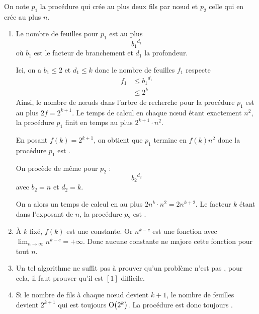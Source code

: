 \begin{td-sol}
    On note \(p_1\) la procédure qui crée au plus deux fils par nœud et \(p_2\) celle qui en crée au plus \(n\).

    \begin{enumerate}
        \item Le nombre de feuilles pour \(p_1\) est au plus
        \begin{equation*}
            {b_1}^{d_1}
        \end{equation*}
        où \(b_1\) est le facteur de branchement et \(d_1\) la profondeur.

        Ici, on a \(b_1 \leq 2\) et \(d_1 \leq k\) donc le nombre de feuilles \(f_1\) respecte 
        \begin{equation*}
            \begin{aligned}
                f_1 
                &\leq {b_1}^{d_1} \\
                &\leq 2^k
            \end{aligned}
        \end{equation*}
        Ainsi, le nombre de nœuds dans l'arbre de recherche pour la procédure \(p_1\) est au plus \(2f = 2^{k+1}\).
        Le temps de calcul en chaque nœud étant exactement \(n^2\), la procédure \(p_1\) finit en temps au plus \(2^{k+1}\cdot n^2\).

        En posant \(f(k) = 2^{k+1}\), on obtient que \(p_1\) termine en \(f(k) n^2\) donc la procédure \(p_1\) est .
        
        \vspace{\baselineskip}

        On procède de même pour \(p_2\) :
        \begin{equation*}
            {b_2}^{d_2}
        \end{equation*}
        avec \(b_2 = n\) et \(d_2 = k\).

        On a alors un temps de calcul en au plus \(2n^k \cdot n^2 = 2 n^{k+2}\). 
        Le facteur \(k\) étant dans l'exposant de \(n\), la procédure \(p_2\) est .

        \item À \(k\) fixé, \(f(k)\) est une constante. Or \(n^{k-c}\) est une fonction avec \(\displaystyle\lim_{n\to\infty} n^{k-c} = +\infty\).
        Donc aucune constante ne majore cette fonction pour tout \(n\).

        \item Un tel algorithme ne suffit pas à prouver qu'un problème n'est pas , pour cela, il faut prouver qu'il est \([1]\) difficile.

        \item Si le nombre de fils à chaque nœud devient \(k+1\), le nombre de feuilles devient \(2^{k+1}\) qui est toujours \(\BigO{2^k}\).
        La procédure est donc toujours .
    \end{enumerate}
\end{td-sol}

